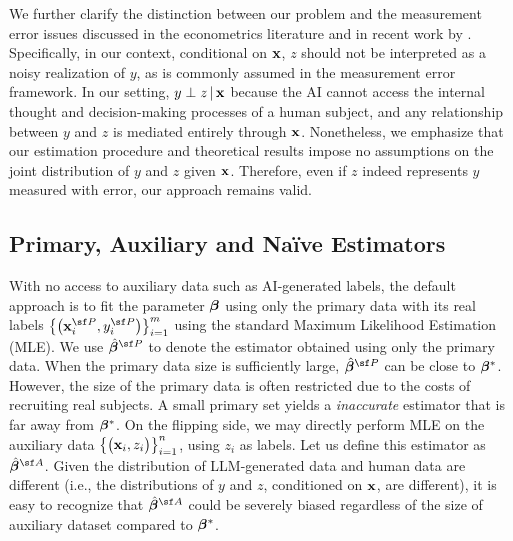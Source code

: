 We further clarify the distinction between our problem and the measurement error issues discussed in the econometrics literature \citep[e.g., see][]{bound2001measurement} and in recent work by \cite{connell2024estimating}. Specifically, in our context, conditional on $\mathbf{x}$, $z$ should not be interpreted as a noisy realization of $y$, as is commonly assumed in the measurement error framework. In our setting, $y \perp z \,|\, \mathbf{x}$ because the AI cannot access the internal thought and decision-making processes of a human subject, and any relationship between $y$ and $z$ is mediated entirely through $\mathbf{x}$. Nonetheless, we emphasize that our estimation procedure and theoretical results impose no assumptions on the joint distribution of $y$ and $z$ given $\mathbf{x}$. Therefore, even if $z$ indeed represents $y$ measured with error, our approach remains valid.


\subsection{Primary, Auxiliary and Na\"ive Estimators} 
\label{sec:3-estimators}
With no access to auxiliary data such as AI-generated labels, the default approach is to fit the parameter $\bm{\beta}$ using only the primary data with its real labels $\left\{\big(\x^{\sf P}_{i}, y^{\sf P}_{i}\big)\right\}_{i = 1}^m$ using the standard Maximum Likelihood Estimation (MLE). We use $\hat{\betavec}^{\sf P}$ to denote the estimator obtained using only the primary data. When the primary data size is sufficiently large, $\hat{\betavec}^{\sf P}$ can be close to $\bm{\beta}^*$. However, the size of the primary data is often restricted due to the costs of recruiting real subjects. A small primary set yields a \textit{inaccurate} estimator that is far away from $\bm{\beta}^*$. 
On the flipping side, we may directly perform MLE on the auxiliary data $\left\{\big(\mathbf{x}_{i}, z_{i}\big)\right\}_{i = 1}^n$, using $z_{i}$ as labels. 
Let us define this estimator as $\hat{\betavec}^{\sf A}$. Given the distribution of LLM-generated data and human data are different (i.e., the distributions of $ y $ and $ z $, conditioned on $ \mathbf{x} $, are different), it is easy to recognize that $\hat{\betavec}^{\sf A}$ could be severely biased regardless of the size of auxiliary dataset compared to $\bm{\beta}^*$.


